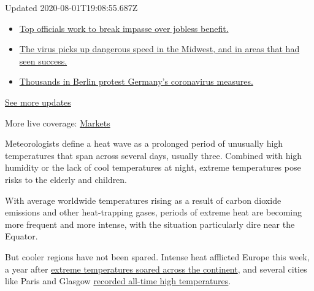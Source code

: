 Updated 2020-08-01T19:08:55.687Z

\begin{itemize}
\tightlist
\item
  \href{https://www.nytimes3xbfgragh.onion/2020/08/01/world/coronavirus-covid-19.html?action=click\&pgtype=Article\&state=default\&region=MAIN_CONTENT_1\&context=storylines_live_updates\#link-3ac56579}{Top
  officials work to break impasse over jobless benefit.}
\item
  \href{https://www.nytimes3xbfgragh.onion/2020/08/01/world/coronavirus-covid-19.html?action=click\&pgtype=Article\&state=default\&region=MAIN_CONTENT_1\&context=storylines_live_updates\#link-8796723}{The
  virus picks up dangerous speed in the Midwest, and in areas that had
  seen success.}
\item
  \href{https://www.nytimes3xbfgragh.onion/2020/08/01/world/coronavirus-covid-19.html?action=click\&pgtype=Article\&state=default\&region=MAIN_CONTENT_1\&context=storylines_live_updates\#link-25930521}{Thousands
  in Berlin protest Germany's coronavirus measures.}
\end{itemize}

\href{https://www.nytimes3xbfgragh.onion/2020/08/01/world/coronavirus-covid-19.html?action=click\&pgtype=Article\&state=default\&region=MAIN_CONTENT_1\&context=storylines_live_updates}{See
more updates}

More live coverage:
\href{https://www.nytimes3xbfgragh.onion/live/2020/07/31/business/stock-market-today-coronavirus?action=click\&pgtype=Article\&state=default\&region=MAIN_CONTENT_1\&context=storylines_live_updates}{Markets}

Meteorologists define a heat wave as a prolonged period of unusually
high temperatures that span across several days, usually three. Combined
with high humidity or the lack of cool temperatures at night, extreme
temperatures pose risks to the elderly and children.

With average worldwide temperatures rising as a result of carbon dioxide
emissions and other heat-trapping gases, periods of extreme heat are
becoming more frequent and more intense, with the situation particularly
dire near the Equator.

But cooler regions have not been spared. Intense heat afflicted Europe
this week, a year after
\href{https://www.nytimes3xbfgragh.onion/2019/06/26/world/europe/europe-heat-wave.html}{extreme
temperatures soared across the continent}, and several cities like Paris
and Glasgow
\href{https://www.nytimes3xbfgragh.onion/2019/07/25/world/europe/heatwave-record-temperatures.html}{recorded
all-time high temperatures}.

